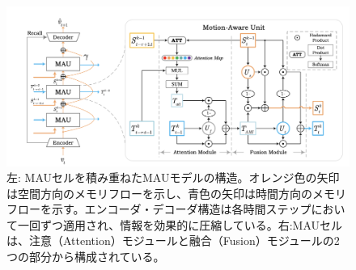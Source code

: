       \begin{figure}[htbp]
        \begin{center}
          \includegraphics[width=160mm]{figures/videoprediction/mau.png}
          \caption{左: MAUセルを積み重ねたMAUモデルの構造。オレンジ色の矢印は空間方向のメモリフローを示し、青色の矢印は時間方向のメモリフローを示す。エンコーダ・デコーダ構造は各時間ステップにおいて一回ずつ適用され、情報を効果的に圧縮している。右:MAUセルは、注意（Attention）モジュールと融合（Fusion）モジュールの2つの部分から構成されている。}
          \label{fig:mau_attention}
        \end{center}
      \end{figure}
        

